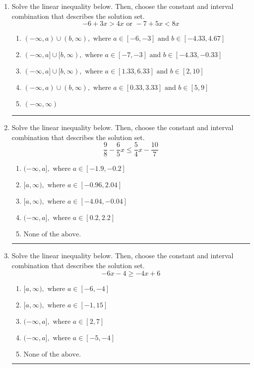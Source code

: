 \documentclass[14pt]{extbook}
\newcommand{\litem}[1]{\item#1\hspace*{-1cm}\rule{\textwidth}{0.4pt}}
\begin{document}
\begin{enumerate}
{\begin{enumerate}[label=\Alph*.]
\end{enumerate} }
\litem{
Solve the linear inequality below. Then, choose the constant and interval combination that describes the solution set.\[ -6 + 3 x > 4 x \text{ or } -7 + 5 x < 8 x \]\begin{enumerate}[label=\Alph*.]
\item \( (-\infty, a) \cup (b, \infty), \text{ where } a \in [-6, -3] \text{ and } b \in [-4.33, 4.67] \)
\item \( (-\infty, a] \cup [b, \infty), \text{ where } a \in [-7, -3] \text{ and } b \in [-4.33, -0.33] \)
\item \( (-\infty, a] \cup [b, \infty), \text{ where } a \in [1.33, 6.33] \text{ and } b \in [2, 10] \)
\item \( (-\infty, a) \cup (b, \infty), \text{ where } a \in [0.33, 3.33] \text{ and } b \in [5, 9] \)
\item \( (-\infty, \infty) \)

\end{enumerate} }
\litem{
Solve the linear inequality below. Then, choose the constant and interval combination that describes the solution set.\[ \frac{9}{8} - \frac{6}{5} x \leq \frac{5}{4} x - \frac{10}{7} \]\begin{enumerate}[label=\Alph*.]
\item \( (-\infty, a], \text{ where } a \in [-1.9, -0.2] \)
\item \( [a, \infty), \text{ where } a \in [-0.96, 2.04] \)
\item \( [a, \infty), \text{ where } a \in [-4.04, -0.04] \)
\item \( (-\infty, a], \text{ where } a \in [0.2, 2.2] \)
\item \( \text{None of the above}. \)

\end{enumerate} }
\litem{
Solve the linear inequality below. Then, choose the constant and interval combination that describes the solution set.\[ -6x -4 \geq -4x + 6 \]\begin{enumerate}[label=\Alph*.]
\item \( [a, \infty), \text{ where } a \in [-6, -4] \)
\item \( [a, \infty), \text{ where } a \in [-1, 15] \)
\item \( (-\infty, a], \text{ where } a \in [2, 7] \)
\item \( (-\infty, a], \text{ where } a \in [-5, -4] \)
\item \( \text{None of the above}. \)


\end{enumerate}}
\end{enumerate}
\end{document}
